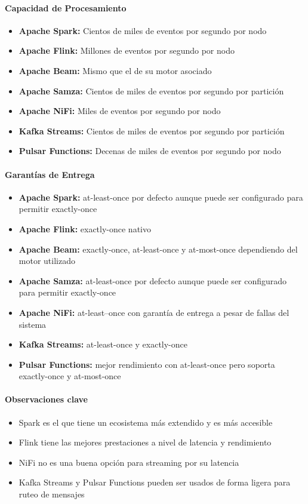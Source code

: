 \paragraph{Capacidad de Procesamiento}
\begin{itemize}
    \item \textbf{Apache Spark:} Cientos de miles de eventos por segundo por nodo
    \item \textbf{Apache Flink:} Millones de eventos por segundo por nodo
    \item \textbf{Apache Beam:} Mismo que el de su motor asociado 
    \item \textbf{Apache Samza:} Cientos de miles de eventos por segundo por partición
    \item \textbf{Apache NiFi:} Miles de eventos por segundo por nodo
    \item \textbf{Kafka Streams:} Cientos de miles de eventos por segundo por partición
    \item \textbf{Pulsar Functions:} Decenas de miles de eventos por segundo por nodo
\end{itemize}
\newpage
\paragraph{Garantías de Entrega}
\begin{itemize}
    \item \textbf{Apache Spark:} at-least-once por defecto aunque puede ser configurado para permitir exactly-once
    \item \textbf{Apache Flink:} exactly-once nativo
    \item \textbf{Apache Beam:} exactly-once, at-least-once y at-most-once dependiendo del motor utilizado
    \item \textbf{Apache Samza:} at-least-once por defecto aunque puede ser configurado para permitir exactly-once
    \item \textbf{Apache NiFi:} at-least--once con garantía de entrega a pesar de fallas del sistema
    \item \textbf{Kafka Streams:} at-least-once y exactly-once
    \item \textbf{Pulsar Functions:} mejor rendimiento con at-least-once pero soporta exactly-once y at-most-once
\end{itemize}

\paragraph{Observaciones clave}
\begin{itemize}
    \item Spark es el que tiene un ecosistema más extendido y es más accesible
    \item Flink tiene las mejores prestaciones a nivel de latencia y rendimiento
    \item NiFi no es una buena opción para streaming por su latencia 
    \item Kafka Streams y Pulsar Functions pueden ser usados de forma ligera para ruteo de mensajes
\end{itemize}

